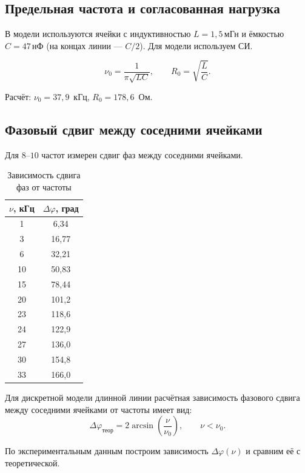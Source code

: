 \documentclass[a4paper,14pt]{extarticle}
\begin{document}
\subsection{Предельная частота и согласованная нагрузка}
В модели используются ячейки с индуктивностью $L=1{,}5\,\text{мГн}$
и ёмкостью $C=47\,\text{нФ}$ (на концах линии --- $C/2$).
Для модели используем СИ.

\begin{equation}
    \nu_0=\frac{1}{\pi\sqrt{LC}},
    \qquad
    R_0=\sqrt{\frac{L}{C}}.
\end{equation}

Расчёт: $\nu_0=37,9$~кГц, $R_0=178,6$~Ом.

\subsection{Фазовый сдвиг между соседними ячейками}
Для $8$--$10$ частот измерен сдвиг фаз между соседними ячейками.

\begin{table}[H]
    \centering
    \caption{Зависимость сдвига фаз от частоты}
    \begin{tabular}{c|c}
        \toprule
        $\nu$, кГц & $\Delta\varphi$, град\\
        \midrule
        1 & 6,34 \\
        3 & 16,77 \\
        6 & 32,21 \\
        10 & 50,83 \\
        15 & 78,44 \\
        20 & 101,2 \\
        23 & 118,6 \\
        24 & 122,9 \\
        27 & 136,0 \\
        30 & 154,8 \\
        33 & 166,0 \\
        \bottomrule
    \end{tabular}
\end{table}

Для дискретной модели длинной линии расчётная
зависимость фазового сдвига между соседними
ячейками от частоты имеет вид:
\begin{equation}
    \Delta\varphi_{\text{теор}} =
    2\arcsin\left(\frac{\nu}{\nu_0}\right),
    \qquad \nu < \nu_0.
\end{equation}

По экспериментальным данным построим зависимость
$\Delta\varphi(\nu)$ и сравним её с теоретической.
\end{document}
